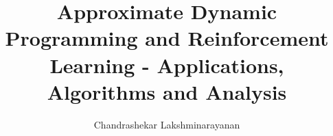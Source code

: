 \documentclass[12pt,twosides]{iiscthes}
\begin{document}
\begin{frontmatter}
%
%
\title{Approximate Dynamic Programming and Reinforcement Learning - Applications, Algorithms and Analysis
	}
\author{Chandrashekar Lakshminarayanan}
\enggfaculty
\iisclogotrue %
\tablespagetrue %
\maketitle
\makecontents
\vspace{10MM}
\noindent
\end{frontmatter}












\end{document}
